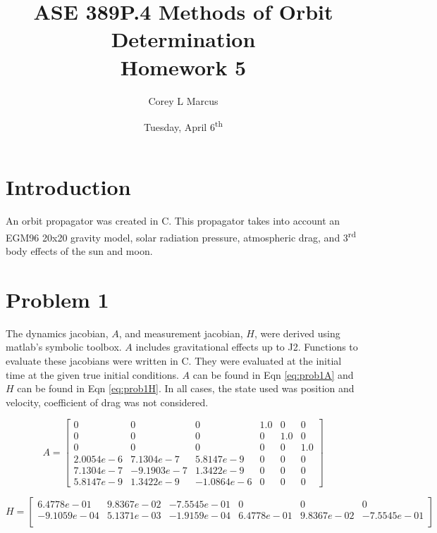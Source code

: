 \documentclass[11pt]{article}
\title{ASE 389P.4 Methods of Orbit Determination \\ Homework 5}
\author{Corey L Marcus} \date{Tuesday, April 6\textsuperscript{th}}
\def\CC{{C\nolinebreak[4]\hspace{-.05em}\raisebox{.4ex}{\tiny\bf ++}}}
\begin{document}
\onehalfspace
\maketitle


\section{Introduction}

An orbit propagator was created in \CC. This propagator takes into account an EGM96 20x20 gravity model, solar radiation pressure, atmospheric drag, and 3\textsuperscript{rd} body effects of the sun and moon. \\

\section{Problem 1}

The dynamics jacobian, $A$, and measurement jacobian, $H$, were derived using matlab's symbolic toolbox. $A$ includes gravitational effects up to J2. Functions to evaluate these jacobians were written in \CC. They were evaluated at the initial time at the given true initial conditions. $A$ can be found in Eqn \eqref{eq:prob1A} and $H$ can be found in Eqn \eqref{eq:prob1H}. In all cases, the state used was position and velocity, coefficient of drag was not considered.

\begin{equation}
\label{eq:prob1A}
A = \left[\begin{array}{cccccc} 0 & 0 & 0 & 1.0 & 0 & 0\\ 0 & 0 & 0 & 0 & 1.0 & 0\\ 0 & 0 & 0 & 0 & 0 & 1.0\\ 2.0054e-6 & 7.1304e-7 & 5.8147e-9 & 0 & 0 & 0\\ 7.1304e-7 & -9.1903e-7 & 1.3422e-9 & 0 & 0 & 0\\ 5.8147e-9 & 1.3422e-9 & -1.0864e-6 & 0 & 0 & 0 \end{array}\right]
\end{equation}

\begin{equation}
\label{eq:prob1H}
H = \begin{bmatrix}
6.4778e-01  & 9.8367e-02 & -7.5545e-01     &       0       &     0     &       0 \\
-9.1059e-04 &  5.1371e-03 &  -1.9159e-04  & 6.4778e-01 &  9.8367e-02 &  -7.5545e-01 \\
\end{bmatrix}
\end{equation}
\end{document}
